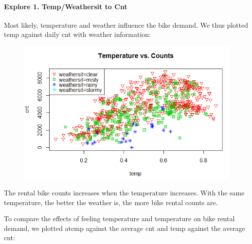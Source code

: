 \documentclass[12pt]{article}
\begin{document}
	\paragraph*{Explore 1. Temp/Weathersit to Cnt} Most likely, temperature and weather influence the bike demand. We thus plotted temp against daily cnt with weather information:
	\begin{figure}[H]
		\centering
		\includegraphics[scale=.85]{figures/temp_counts.png}
	\end{figure}
	
	The rental bike counts increases when the temperature increases. With the same temperature, the better the weather is, the more bike rental counts are.
	
	To compare the effects of feeling temperature and temperature on bike rental demand, we plotted atemp against the average cnt and temp against the average cnt:
	
\end{document}
